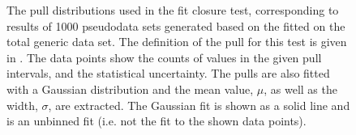 \begin{figure}[htbp!]
{    }
    \caption{\label{fig:pull_distributions}The pull distributions used in the \Mbc fit closure test, 
    corresponding to results of 1000 pseudodata sets generated based on the \PDF fitted on the total generic \MC data set.
    The definition of the pull for this test is given in .
    The data points show the counts of values in the given pull intervals, and the statistical uncertainty.
    The pulls are also fitted with a Gaussian distribution and the mean value, $\mu$, as well as the width, $\sigma$, are extracted.
    The Gaussian fit is shown as a solid line and is an unbinned fit (i.e. not the fit to the shown data points).
    }
\end{figure}

